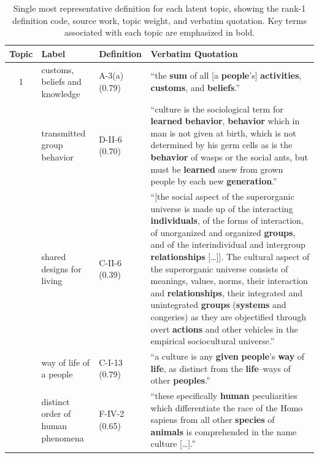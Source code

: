 \documentclass[11pt]{article}
\begin{document}
\begin{table}[p]
\centering
\caption{Single most representative definition for each latent topic, showing the rank-1 definition code, source work, topic weight, and verbatim quotation. Key terms associated with each topic are emphasized in bold.}
\label{tab:lda-exemplars}
\footnotesize
\setlength{\tabcolsep}{4pt}
\begin{tabular}{c>{\raggedright\arraybackslash}p{2.8cm}>{\raggedright\arraybackslash}p{2.2cm}p{9.4cm}}
\toprule
Topic & Label & Definition & Verbatim Quotation \\
\midrule
1 & customs, beliefs and knowledge & A-3(a) (0.79) \newline \citealt{dixon1928} & ``the \textbf{sum} of all [a \textbf{people}'s] \textbf{activities}, \textbf{customs}, and \textbf{beliefs}.'' \\
\addlinespace[2pt]
2 & transmitted group behavior & D-II-6 (0.70) \newline \citealt{benedict1947} & ``culture is the sociological term for \textbf{learned} \textbf{behavior}, \textbf{behavior} which in man is not given at birth, which is not determined by his germ cells as is the \textbf{behavior} of wasps or the social ants, but must be \textbf{learned} anew from grown people by each new \textbf{generation}.'' \\
\addlinespace[2pt]
3 & shared designs for living & C-II-6 (0.39) \newline \citealt{sorokin1947} & ``[the social aspect of the superorganic universe is made up of the interacting \textbf{individuals}, of the forms of interaction, of unorganized and organized \textbf{groups}, and of the interindividual and intergroup \textbf{relationships} [\ldots]]. The cultural aspect of the superorganic universe consists of meanings, values, norms, their interaction and \textbf{relationships}, their integrated and unintegrated \textbf{groups} (\textbf{systems} and congeries) as they are objectified through overt \textbf{actions} and other vehicles in the empirical sociocultural universe.'' \\
\addlinespace[2pt]
4 & way of life of a people & C-I-13 (0.79) \newline \citealt{kluckhohnleighton1946} & ``a culture is any \textbf{given} \textbf{people}'s \textbf{way} of \textbf{life}, as distinct from the \textbf{life}--ways of other \textbf{peoples}.'' \\
\addlinespace[2pt]
5 & distinct order of human phenomena & F-IV-2 (0.65) \newline \citealt{ostwald1915} & ``these specifically \textbf{human} peculiarities which differentiate the race of the Homo sapiens from all other \textbf{species} of \textbf{animals} is comprehended in the name culture [\ldots].'' \\

\end{tabular}
\end{table}
\end{document}

